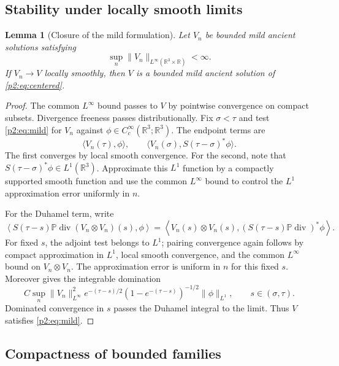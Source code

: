\documentclass[11pt]{amsart}
\theoremstyle{plain}
\newtheorem{lemma}[lemma]{Lemma}
\theoremstyle{definition}
\theoremstyle{remark}
\numberwithin{equation}{section}
\newcommand{\R}{\mathbb R}
\newcommand{\divergence}{\operatorname{div}}
\begin{document}
\subsection{Stability under locally smooth limits}

\begin{lemma}[Closure of the mild formulation]\label{p2:lem:mild-limit}
Let \(V_n\) be bounded mild ancient solutions satisfying
\[
   \sup_n\|V_n\|_{L^\infty(\R^3\times\R)}<\infty .
\]
If \(V_n\to V\) locally smoothly, then \(V\) is a bounded mild ancient solution
of \eqref{p2:eq:centered}.
\end{lemma}

\begin{proof}
The common \(L^\infty\) bound passes to \(V\) by pointwise convergence on
compact subsets.  Divergence freeness passes distributionally.  Fix
\(\sigma<\tau\) and test \eqref{p2:eq:mild} for \(V_n\) against
\(\phi\in C_c^\infty(\R^3;\R^3)\).  The endpoint terms are
\[
   \langle V_n(\tau),\phi\rangle,
   \qquad
   \langle V_n(\sigma),S(\tau-\sigma)^*\phi\rangle .
\]
The first converges by local smooth convergence.  For the second, note that
\(S(\tau-\sigma)^*\phi\in L^1(\R^3)\).  Approximate this \(L^1\) function by
a compactly supported smooth function and use the common \(L^\infty\) bound to
control the \(L^1\) approximation error uniformly in \(n\).

For the Duhamel term, write
\[
   \left\langle
      S(\tau-s)\mathbb P\divergence(V_n\otimes V_n)(s),\phi
   \right\rangle
   =
   \left\langle
      V_n(s)\otimes V_n(s),
      (S(\tau-s)\mathbb P\divergence)^*\phi
   \right\rangle .
\]
For fixed \(s\), the adjoint test belongs to \(L^1\); pairing convergence
again follows by compact approximation in \(L^1\), local smooth convergence,
and the common \(L^\infty\) bound on \(V_n\otimes V_n\).  The approximation
error is uniform in \(n\) for this fixed \(s\).  Moreover
 gives the integrable domination
\[
   C\sup_n\|V_n\|_{L^\infty}^2
   e^{-(\tau-s)/2}(1-e^{-(\tau-s)})^{-1/2}\|\phi\|_{L^1},
   \qquad s\in(\sigma,\tau).
\]
Dominated convergence in \(s\) passes the Duhamel integral to the limit.
Thus \(V\) satisfies \eqref{p2:eq:mild}.
\end{proof}

\subsection{Compactness of bounded families}
\end{document}
